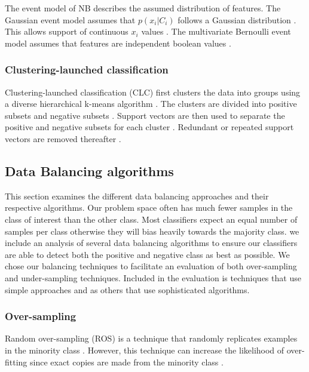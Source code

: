 \documentclass{sig-alternate-05-2015}
\begin{document}
	The event model of NB describes the assumed distribution of features. The Gaussian event model assumes that $p(x_i|C_i)$ follows a Gaussian distribution \cite{John:1995:ECD:2074158.2074196}. This allows support of continuous $x_i$ values \cite{John:1995:ECD:2074158.2074196}. The multivariate Bernoulli event model assumes that features are independent boolean values \cite{mccallum1998comparison}.
	
	\subsubsection{Clustering-launched classification}
	Clustering-launched classification (CLC) first clusters the data into groups using a diverse hierarchical k-means algorithm \cite{Luo20097562}. The clusters are divided into positive subsets and negative subsets \cite{Luo20097562}. Support vectors are then used to separate the positive and negative subsets for each cluster \cite{Luo20097562}. Redundant or repeated support vectors are removed thereafter \cite{Luo20097562}.
	
	\subsection{Data Balancing algorithms}
	\label{sec:data_balancing_algorithms}
	This section examines the different data balancing approaches and their respective algorithms. Our problem space often has much fewer samples in the class of interest than the other class. Most classifiers expect an equal number of samples per class otherwise they will bias heavily towards the majority class. we include an analysis of several data balancing algorithms to ensure our classifiers are able to detect both the positive and negative class as best as possible. We chose our balancing techniques to facilitate an evaluation of both over-sampling and under-sampling techniques. Included in the evaluation is techniques that use simple approaches and as others that use sophisticated algorithms.
	\subsubsection{Over-sampling}
	Random over-sampling (ROS) is a technique that randomly replicates examples in the minority class \cite{Batista:2004:SBS:1007730.1007735}. However, this technique can increase the likelihood of over-fitting since exact copies are made from the minority class \cite{Batista:2004:SBS:1007730.1007735}.
	
\end{document}
